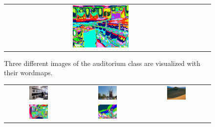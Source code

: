 \documentclass[a4paper]{article}
\begin{document}
\begin{figure}[!ht]
\begin{tabular}{ccc}
{\includegraphics[width=0.3\textwidth]{audi3_wordmap}}\\
\end{tabular}
\caption{Three different images of the auditorium class are visualized with their wordmaps.}
\end{figure}

\begin{figure}[!ht]
\centering
\begin{tabular}{ccc}
{\includegraphics[width=0.3\textwidth]{laundromat}} &
{\includegraphics[width=0.3\textwidth]{windmill}} &
{\includegraphics[width=0.3\textwidth]{desert}} \\
{\includegraphics[width=0.3\textwidth]{laundromat_wordmap}} &
{\includegraphics[width=0.3\textwidth]{windmill_wordmap}} &

\end{tabular}
\end{figure}
\end{document}
